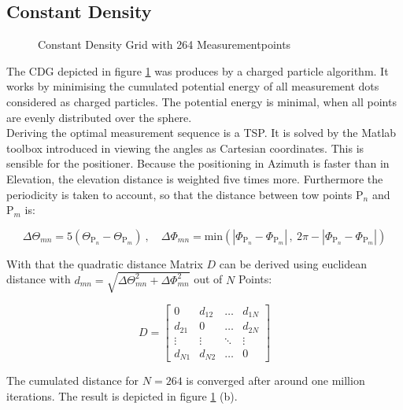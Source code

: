 \subsection{Constant Density}

\begin{figure}[h]
  \centering
  \centering
\caption{Constant Density Grid with 264 Measurementpoints}
\label{fig:cdg}
\end{figure}

The \ac{CDG} depicted in figure \ref{fig:cdg} was produces by a charged particle algorithm. It works by minimising the cumulated potential energy of all measurement dots considered as charged particles. The potential energy is minimal, when all points are evenly distributed over the sphere.\\ 
Deriving the optimal measurement sequence is a \ac{TSP}. It is solved by the Matlab toolbox introduced in \cite{tsp} viewing the angles as Cartesian coordinates. This is sensible for the positioner. Because the positioning in Azimuth is faster than in Elevation, the elevation distance is weighted five times more. Furthermore the periodicity is taken to account, so that the distance between tow points $\text{P}_n$ and $\text{P}_m$ is:

\begin{equation}
\Delta\Theta_{mn} = 5\left(\Theta_{\text{P}_n}-\Theta_{\text{P}_m}\right)\ ,\quad \Delta\Phi_{mn} = \text{min}\left(|\Phi_{\text{P}_n}-\Phi_{\text{P}_m}|\, ,\ 2\pi-|\Phi_{\text{P}_n}-\Phi_{\text{P}_m}|\right)
\end{equation}

With that the quadratic distance Matrix $D$ can be derived using euclidean distance with $d_{mn} = \sqrt{\Delta\Theta_{mn}^2+\Delta\Phi_{mn}^2}$ out of $N$ Points:

\begin{equation}
D = \begin{bmatrix}
 0 & d_{12} & \dots & d_{1N}\\
 d_{21} & 0 & \dots & d_{2N}\\
 \vdots & \vdots & \ddots & \vdots\\
 d_{N1} & d_{N2} & \dots & 0
\end{bmatrix}
\end{equation}

The cumulated distance for $N = 264$ is converged after around one million iterations. The result is depicted in figure \ref{fig:cdg} (b).

